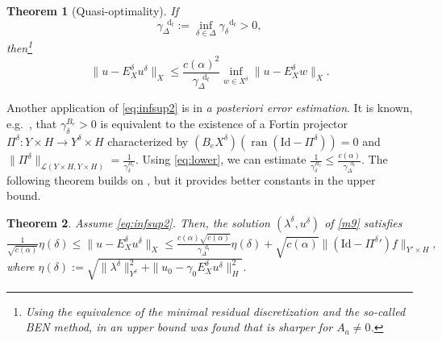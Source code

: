 \documentclass{amsart}
\newtheorem{theorem}{Theorem}[section]
\numberwithin{equation}{section}
\newcommand{\cL}{\mathcal L}
\newcommand{\identity}{\mathrm{Id}}
\DeclareMathOperator{\ran}{ran}
\newcommand{\1}{\mathbb 1}
\newcommand*\diff{\mathop{}\!\mathrm{d}}
\newcommand{\be}{\begin{equation}}
\newcommand{\ee}{\end{equation}}
\begin{document}
\begin{theorem}[Quasi-optimality] \label{thm:quasi} If
\be \label{eq:infsup2}
\gamma^{\diff_t}_\Delta:=\inf_{\delta \in \Delta} \gamma^{\diff_t}_\delta >0,
\ee
then\footnote{Using the equivalence of the minimal residual discretization and the so-called BEN method, in \cite[Thm.~3.1]{249.992} an upper bound was found that is sharper for $A_a \neq 0$.}
$$
\|u-E_X^\delta u^\delta\|_X \leq \frac{c(\alpha)^2}{\gamma^{\diff_t}_\Delta} \inf_{w \in X^\delta} \|u-E_X^\delta  w\|_X.
$$
\end{theorem}

Another application of \eqref{eq:infsup2} is in \emph{a posteriori error estimation}.  
It is known, e.g.~\cite[Prop.~5.1]{249.992}, that $\gamma_\delta^{B_e}>0$ is equivalent to the existence of a Fortin projector $\Pi^\delta\colon Y\times H \rightarrow Y^\delta\times H$ characterized by $(B_e X^\delta)(\ran (\identity-\Pi^\delta))=0$ and $\|\Pi^\delta\|_{\cL(Y\times H,Y\times H)} =\frac{1}{\gamma_\delta^{B_e}}$.
Using \eqref{eq:lower}, we can estimate $\frac{1}{\gamma_\delta^{B_e}} \leq \frac{c(\alpha)}{\gamma^{\diff_t}_\Delta}$. The following theorem builds on \cite[Thm.~2.1]{35.93556}, but it provides better constants in the upper bound.

\begin{theorem} \label{thm:4}
Assume \eqref{eq:infsup2}. Then, the solution $(\lambda^\delta,u^\delta)$ of \eqref{m9} satisfies
$$
\tfrac{1}{\sqrt{c(\alpha)}} \eta(\delta)\leq \|u-E_X^\delta u^\delta\|_X \leq \tfrac{c(\alpha) \sqrt{c(\alpha)}}{\gamma_\Delta^{\diff_t}} \eta(\delta)+\sqrt{c(\alpha)}\|(\identity-{\Pi^\delta}' )f\|_{Y'\times H},
$$
where $\eta(\delta):=\sqrt{\|\lambda^\delta\|_{Y^\delta}^2+\|u_0-\gamma_0 E_X^\delta u^\delta\|_H^2}$.
\end{theorem}
\end{document}
